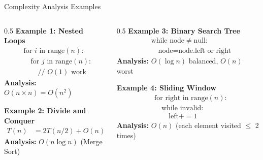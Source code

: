 \documentclass[aspectratio=169,xcolor=dvipsnames]{beamer}
\begin{document}
\begin{frame}{Complexity Analysis Examples}
  \begin{columns}
    \begin{column}{0.5\textwidth}
      \textbf{Example 1: Nested Loops}
      \begin{align*}
        &\text{for } i \text{ in range}(n): \\
        &\quad \text{for } j \text{ in range}(n): \\
        &\quad\quad \text{// } O(1) \text{ work}
      \end{align*}
      \textbf{Analysis:} $O(n \times n) = O(n^2)$

      \vspace{0.3cm}
      \textbf{Example 2: Divide and Conquer}
      \begin{align*}
        T(n) &= 2T(n/2) + O(n)
      \end{align*}
      \textbf{Analysis:} $O(n \log n)$ (Merge Sort)
    \end{column}

    \begin{column}{0.5\textwidth}
      \textbf{Example 3: Binary Search Tree}
      \begin{align*}
        &\text{while } \text{node} \ne \text{null}: \\
        &\quad \text{node} = \text{node.left or right}
      \end{align*}
      \textbf{Analysis:} $O(\log n)$ balanced, $O(n)$ worst

      \vspace{0.3cm}
      \textbf{Example 4: Sliding Window}
      \begin{align*}
        &\text{for } \text{right} \text{ in range}(n): \\
        &\quad \text{while } \text{invalid}: \\
        &\quad\quad \text{left} += 1
      \end{align*}
      \textbf{Analysis:} $O(n)$ (each element visited $\le$ 2 times)
    \end{column}
  \end{columns}
\end{frame}
\end{document}

